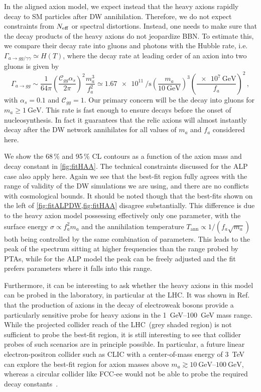 \documentclass{article}
\begin{document}
In the aligned axion model, we expect instead that the heavy axions rapidly decay to SM particles after DW annihilation. Therefore, we do not expect constraints from $N_{\rm eff}$ or spectral distortions. Instead, one needs to make sure that the decay products of the heavy axions do not jeopardize BBN. To estimate this, we compare their decay rate into gluons and photons with the Hubble rate, i.e.\ $\Gamma_{a \rightarrow gg/\gamma \gamma} \simeq H(T)$, where the decay rate at leading order of an axion into two gluons is given by
\begin{equation}
    \Gamma_{a\rightarrow gg}\sim \frac{1}{64\pi} \left(\frac{\mathcal{C}_{gg} \alpha_{s}}{2 \pi}\right)^{2} \frac{m_{a}^{3}}{f_{a}^{2}} \simeq \SI{1.67e11}{\per\second} \left(\frac{m_{a}}{\SI{10}{\GeV}}\right)^{3}\left(\frac{\SI{e7}{\GeV}}{f_{a}}\right)^{2} \,,
\end{equation}
with $\alpha_{s} = 0.1$ and $\mathcal{C}_{gg}=1$. 
Our primary concern will be the decay into gluons for $m_{a}\geq \SI{1}{\GeV}$. This rate is fast enough to ensure decays before the onset of nucleosynthesis. In fact it guarantees that the relic axions will almost instantly decay after the DW network annihilates for all values of $m_{a}$ and $f_{a}$ considered here. 

We show the 68\,\% and 95\,\% CL contours as a function of the axion mass and decay constant in \cref{fig:fitHAA}. The technical constraints discussed for the ALP case also apply here. Again we see that the best-fit region fully agrees with the range of validity of the DW simulations we are using, and there are no conflicts with cosmological bounds. It should be noted though that the best-fits shown on the left of \cref{fig:fitALPDW,fig:fitHAA} disagree substantially. This difference is due to the heavy axion model possessing effectively only one parameter, with the surface energy $\sigma\propto f_a^2m_a$ and the annihilation temperature $T_\mathrm{ann}\propto 1/(f_a\sqrt{m_a})$ both being controlled by the same combination of parameters. This leads to the peak of the spectrum sitting at higher frequencies than the range probed by PTAs, while for the ALP model the peak can be freely adjusted and the fit prefers parameters where it falls into this range.

Furthermore, it can be interesting to ask whether the heavy axions in this model can be probed in the laboratory, in particular at the LHC. It was shown in Ref.~\cite{Bauer:2017ris} that the production of axions in the decay of electroweak bosons provide a particularly sensitive probe for heavy axions in the \SIrange{1}{100}{\GeV} mass range. 
While the projected collider reach of the LHC~(grey shaded region) is not sufficient to probe the best-fit region, it is still interesting to see that collider probes of such scenarios are in principle possible.
In particular, a future linear electron-positron collider such as CLIC with a center-of-mass energy of \SI{3}{\TeV} can explore the best-fit region for axion masses above $m_a \gtrsim \SIrange{10}{100}{\GeV}$, whereas a circular collider like FCC-ee would not be able to probe the required decay constants~\cite{Bauer:2018uxu}.
\end{document}
